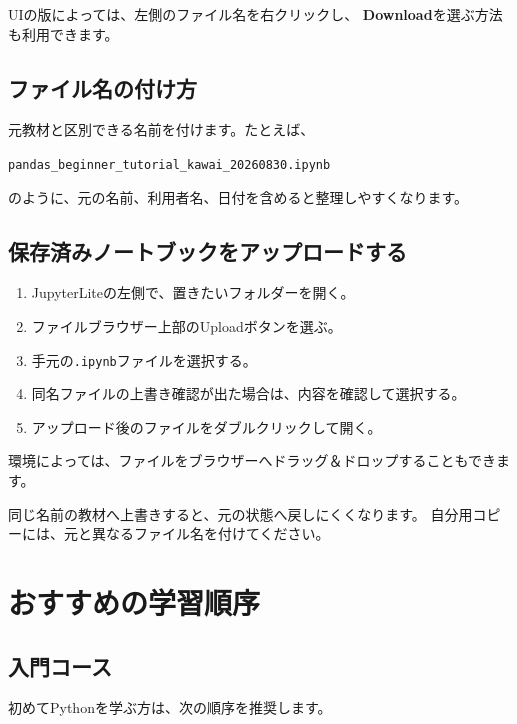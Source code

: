 \documentclass[a4paper,11pt]{ltjsarticle}
\newcommand{\menu}[1]{\textsf{\bfseries #1}}
\newcommand{\filepath}[1]{\nolinkurl{#1}}
\begin{document}
UIの版によっては、左側のファイル名を右クリックし、
\menu{Download}を選ぶ方法も利用できます。

\subsection{ファイル名の付け方}

元教材と区別できる名前を付けます。たとえば、

\begin{center}
  \filepath{pandas_beginner_tutorial_kawai_20260830.ipynb}
\end{center}

のように、元の名前、利用者名、日付を含めると整理しやすくなります。

\subsection{保存済みノートブックをアップロードする}

\begin{enumerate}
  \item JupyterLiteの左側で、置きたいフォルダーを開く。
  \item ファイルブラウザー上部のUploadボタンを選ぶ。
  \item 手元の\texttt{.ipynb}ファイルを選択する。
  \item 同名ファイルの上書き確認が出た場合は、内容を確認して選択する。
  \item アップロード後のファイルをダブルクリックして開く。
\end{enumerate}

環境によっては、ファイルをブラウザーへドラッグ＆ドロップすることもできます。

\begin{warningbox}[上書き前の確認]
同じ名前の教材へ上書きすると、元の状態へ戻しにくくなります。
自分用コピーには、元と異なるファイル名を付けてください。
\end{warningbox}

\section{おすすめの学習順序}

\subsection{入門コース}

初めてPythonを学ぶ方は、次の順序を推奨します。
\end{document}
